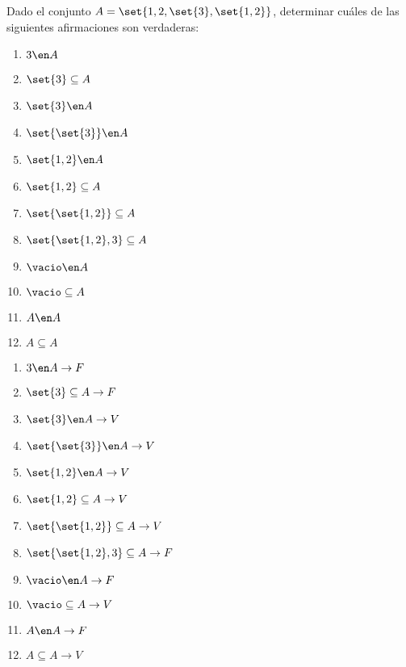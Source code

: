 \begin{enunciado}{\ejercicio}

  Dado el conjunto $A = \set{1,2,\set{3},\set{1,2}}$,
  determinar cuáles de las siguientes afirmaciones son verdaderas:\par

  \begin{multicols}{4}
    \begin{enumerate}[label=(\roman*)]
      \item $3 \en A         $
      \item $\set{3} \subseteq A $
      \item $\set{3} \en A    $
      \item $\set{\set{3}} \en A $
      \item $\set{1,2} \en A $
      \item $\set{1,2} \subseteq A  $
      \item $\set{\set{1,2}} \subseteq A  $
      \item $\set{\set{1,2}, 3} \subseteq A  $
      \item $\vacio \en A  $
      \item $\vacio \subseteq A  $
      \item $A \en A  $
      \item $A \subseteq A  $
    \end{enumerate}
  \end{multicols}

\end{enunciado}

\begin{multicols}{3}
  \begin{enumerate}[label=(\roman*)]
    \item $3 \en A       \to F  $
    \item $\set{3} \subseteq A \to F$
    \item $\set{3} \en A    \to V$
    \item $\set{\set{3}} \en A \to V$
    \item $\set{1,2} \en A \to V$
    \item $\set{1,2} \subseteq A \to V $
    \item $\set{\set{1,2}} \subseteq A \to V $
    \item ${\set{\set{1,2}, 3} \subseteq A \to F}$
    \item $\vacio \en A \to F $
    \item $\vacio \subseteq A \to V $
    \item $A \en A \to F $
    \item $A \subseteq A \to V $
  \end{enumerate}
\end{multicols}
